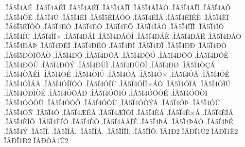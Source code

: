 {.^^ce^^c55^^cf4^^c4^^c9
.^^ce^^c55^^cf4^^c4^^c9^^ce
.^^ce^^c55^^cf4^^c4^^c9^^cf
.^^ce^^c55^^cf4^^c4^^ce^^cf
.^^ce^^c55^^cf4^^c4^^cf^^c2^^d2
.^^ce^^c55^^cf4^^c4^^cf^^cc
.^^ce^^c55^^cf4^^c4^^d5
.^^ce^^c55^^cf4^^d6^^c9
.^^ce^^c55^^cf4^^da
.^^ce^^c55^^cf4^^cb^^cc
.^^ce^^c56^^cf5^^cb^^cc^^c1^^d3^^d3
.^^ce^^c55^^cf4^^cb^^cc^^c5
.^^ce^^c55^^cf4^^cb^^cc^^c9^^cb
.^^ce^^c55^^cf4^^cb^^cf
.^^ce^^c56^^cf5^^cb^^cf^^d2^^d4
.^^ce^^c55^^cf4^^cb^^d2
.^^ce^^c55^^cf4^^cb^^d3
.^^ce^^c55^^cf4^^cb^^d5
.^^ce^^c55^^cf4^^cd^^c5^^d2
.^^ce^^c55^^cf4^^cd^^cf^^cc
.^^ce^^c55^^cf4^^cd^^d2
.^^ce^^c55^^cf4^^cd^^d9
.^^ce^^c55^^cf4^^ce^^cf^^d7
.^^ce^^c55^^cf4^^d0^^c1^^cc
.^^ce^^c55^^cf4^^d0^^c1^^d3^^ce
.^^ce^^c55^^cf4^^d0^^c1^^c8
.^^ce^^c55^^cf4^^d0^^c5^^cb
.^^ce^^c55^^cf4^^d0^^c5^^d2
.^^ce^^c55^^cf4^^d0^^c5^^de
.^^ce^^c55^^cf4^^d0^^c9^^cc
.^^ce^^c55^^cf4^^d0^^c9^^d3
.^^ce^^c55^^cf4^^d0^^cc
.^^ce^^c55^^cf4^^d0^^cf
.^^ce^^c55^^cf4^^d0^^d0
.^^ce^^c55^^cf4^^d0^^d2
.^^ce^^c56^^cf5^^d0^^d2^^cf^^d4^^c5^^d2
.^^ce^^c55^^cf4^^d0^^d4
.^^ce^^c55^^cf4^^d0^^d5^^c2
.^^ce^^c55^^cf4^^d0^^d5^^d3
.^^ce^^c55^^cf4^^d0^^d5^^d4
.^^ce^^c55^^cf4^^d0^^d5^^c8
.^^ce^^c55^^cf4^^d0^^d5^^db
.^^ce^^c55^^cf4^^d0^^d5^^dd
.^^ce^^c55^^cf4^^d0^^d9^^cc
.^^ce^^c55^^cf4^^d0^^d9^^d4^^ce
.^^ce^^c55^^cf4^^d0^^d8
.^^ce^^c55^^cf4^^d2^^c7^^c1
.^^ce^^c55^^cf4^^d2^^c4^^c9^^ce
.^^ce^^c55^^cf4^^d2^^c9
.^^ce^^c55^^cf4^^d2^^cf^^db
.^^ce^^c55^^cf4^^d3^^c1
.^^ce^^c55^^cf4^^d3^^d7
.^^ce^^c55^^cf4^^d3^^c5
.^^ce^^c55^^cf4^^d3^^c9
.^^ce^^c55^^cf4^^d3^^cc^^c1^^c2
.^^ce^^c55^^cf4^^d3^^cd^^cf^^d4^^d2
.^^ce^^c55^^cf4^^d3^^cd^^d9
.^^ce^^c55^^cf4^^d3^^ce^^cf^^d7^^c1^^d4
.^^ce^^c55^^cf4^^d3^^cf^^c2
.^^ce^^c55^^cf4^^d3^^cf^^da
.^^ce^^c55^^cf4^^d3^^d0^^cf^^d2^^c9
.^^ce^^c55^^cf4^^d3^^d4^^c5^^d0
.^^ce^^c55^^cf4^^d3^^d4^^cf^^d2
.^^ce^^c55^^cf4^^d3^^d4^^d2^^c9
.^^ce^^c55^^cf4^^d3^^d4^^d2^^cf
.^^ce^^c55^^cf4^^d3^^d4^^d2^^d9
.^^ce^^c55^^cf4^^d3^^d4^^d5
.^^ce^^c55^^cf4^^d3^^d4^^d9
.^^ce^^c55^^cf4^^d3^^d5^^dd^^c5
.^^ce^^c55^^cf4^^d3^^de
.^^ce^^c55^^cf4^^d3^^d9
.^^ce^^c55^^cf4^^d3^^d1
.^^ce^^c55^^cf4^^d4
.^^ce^^c55^^cf4^^c6^^c9^^c3
.^^ce^^c55^^cf4^^c6^^cf^^d2^^cd
.^^ce^^c55^^cf4^^c8^^c1
.^^ce^^c55^^cf4^^c8^^d7^^c1
.^^ce^^c55^^cf4^^c8^^cc^^c1
.^^ce^^c55^^cf4^^c8^^cd^^d5
.^^ce^^c55^^cf4^^c8^^cf^^d4
.^^ce^^c55^^cf4^^c8^^d2
.^^ce^^c55^^cf4^^c3^^c5^^ce^^c9
.^^ce^^c55^^cf4^^de^^c5
.^^ce^^c55^^cf4^^de^^c5^^d2
.^^ce^^c55^^cf4^^de^^c9
.^^ce^^c55^^cf4^^dd
.^^ce^^c55^^cf^^ce.
.^^ce^^c55^^cf^^ce^^c1.
.^^ce^^c55^^cf^^ce^^c5.
.^^ce^^c55^^cf^^ce^^cf^^cd.
.^^ce^^c55^^cf^^ce^^d5.
^^ce^^c51^^d02
^^ce^^c5^^d0^^cf1^^da2
^^ce^^c5^^d0^^cf1^^cb2
^^ce^^c5^^d0^^cf1^^d02
^^ce^^c5^^d0^^d2^^c51^^da2
}
